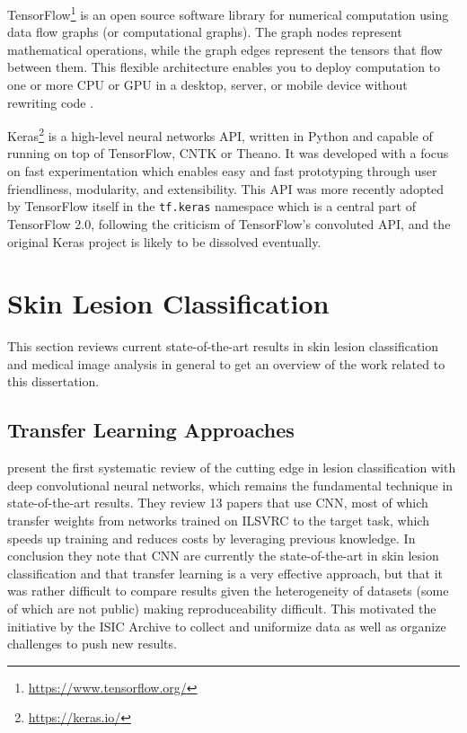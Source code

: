 TensorFlow\footnote{\url{https://www.tensorflow.org/}} is an open source software library for numerical computation using data flow graphs (or computational graphs). The graph nodes represent mathematical operations, while the graph edges represent the tensors that flow between them. This flexible architecture enables you to deploy computation to one or more CPU or GPU in a desktop, server, or mobile device without rewriting code \cite{tensorflow}.

Keras\footnote{\url{https://keras.io/}} is a high-level neural networks API, written in Python and capable of running on top of TensorFlow, CNTK or Theano. It was developed with a focus on fast experimentation which enables easy and fast prototyping through user friendliness, modularity, and extensibility. This API was more recently adopted by TensorFlow itself in the \verb|tf.keras| namespace which is a central part of TensorFlow 2.0, following the criticism of TensorFlow's convoluted API, and the original Keras project is likely to be dissolved eventually.

\section{Skin Lesion Classification}

This section reviews current state-of-the-art results in skin lesion classification and medical image analysis in general to get an overview of the work related to this dissertation.

\subsection{Transfer Learning Approaches}

\citeauthor{Brinker2018} \cite{Brinker2018} present the first systematic review of the cutting edge in lesion classification with deep convolutional neural networks, which remains the fundamental technique in state-of-the-art results. They review 13 papers that use \ac{CNN}, most of which transfer weights from networks trained on \ac{ILSVRC} to the target task, which speeds up training and reduces costs by leveraging previous knowledge. In conclusion they note that \ac{CNN} are currently the state-of-the-art in skin lesion classification and that transfer learning is a very effective approach, but that it was rather difficult to compare results given the heterogeneity of datasets (some of which are not public) making reproduceability difficult. This motivated the initiative by the \ac{ISIC} Archive to collect and uniformize data as well as organize challenges to push new results.

